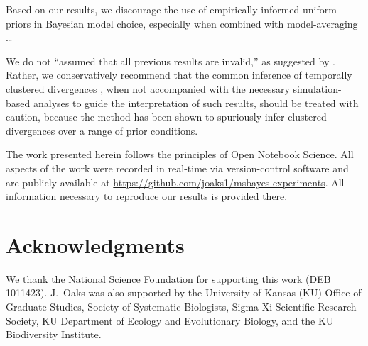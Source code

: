 \documentclass[letterpaper,12pt]{article}
\begin{document}
\begin{linenumbers}
Based on our results, we discourage the use of empirically informed uniform
priors in Bayesian model choice, especially when combined with model-averaging
\ldots

We do not ``assumed that all previous \msb results are invalid,'' as suggested
by \citet{Hickerson2013}.
Rather, we conservatively recommend that the common inference of temporally
clustered divergences \citep{Barber2010, Bell2012, Carnaval2009, Chan2011,
Daza2010, Hickerson2006, Huang2011, Lawson2010, Leache2007, Plouviez2009,
Stone2012, Voje2009}, when not accompanied with the necessary simulation-based
analyses to guide the interpretation of such results, should be treated with
caution, because the method has been shown to spuriously infer clustered
divergences over a range of prior conditions.

The work presented herein follows the principles of Open Notebook Science.
All aspects of the work were recorded in real-time via version-control
software and are publicly available at
\href{https://github.com/joaks1/msbayes-experiments}{https://github.com/joaks1/msbayes-experiments}.
All information necessary to reproduce our results is provided there.


\section*{Acknowledgments}
We thank the National Science Foundation for supporting this work (DEB
1011423).
J.\ Oaks was also supported by the University of Kansas (KU) Office of Graduate
Studies, Society of Systematic Biologists, Sigma Xi Scientific Research
Society, KU Department of Ecology and Evolutionary Biology, and the KU
Biodiversity Institute.


% 

\newpage
\singlespacing

\renewcommand\listfigurename{Figure Captions}
\renewcommand\cftdotsep{\cftnodots}
\setlength\cftbeforefigskip{10pt}
\listoffigures


\end{linenumbers}

\newpage
\singlespacing



\clearpage

\newpage
\end{document}
